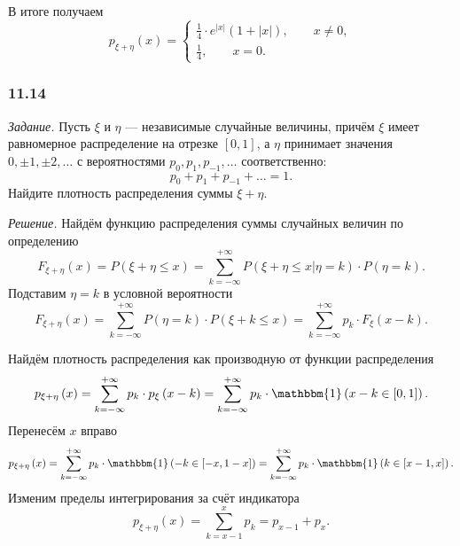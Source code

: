В итоге получаем
$$p_{ \xi + \eta } \left( x \right) =
\begin{cases}
\frac{1}{4} \cdot e^{ \left| x \right| } \left( 1 + \left| x \right| \right), \qquad x \neq 0, \\
\frac{1}{4}, \qquad x = 0.
\end{cases}$$

\subsubsection*{11.14}

\textit{Задание.}
Пусть $ \xi $ и $ \eta $ --- независимые случайные величины,
причём $ \xi $ имеет равномерное распределение на отрезке $ \left[ 0, 1 \right] $,
а $ \eta $ принимает значения $0, \pm 1, \pm 2, \dotsc $ с вероятностями $p_0, p_1, p_{-1}, \dotsc $ соответственно:
$$p_0 + p_1 + p_{-1} + \dotsc =
1.$$
Найдите плотность распределения суммы $ \xi + \eta $.

\textit{Решение.} Найдём функцию распределения суммы случайных величин по определению
$$F_{ \xi + \eta } \left( x \right) =
P \left( \xi + \eta \leq x \right) =
\sum \limits_{k = - \infty }^{+ \infty } P \left( \left. \xi + \eta \leq x \right| \eta = k \right) \cdot P \left( \eta = k \right).$$
Подставим $ \eta = k$ в условной вероятности
$$F_{ \xi + \eta } \left( x \right) =
\sum \limits_{k = - \infty }^{+ \infty } P \left( \eta = k \right) \cdot P \left( \xi + k \leq x \right) =
\sum \limits_{k = - \infty }^{+ \infty } p_k \cdot F_{ \xi } \left( x-k \right).$$

Найдём плотность распределения как производную от функции распределения
$$p_{ \xi + \eta } \left( x \right) =
\sum \limits_{k = - \infty }^{+ \infty } p_k \cdot p_{ \xi } \left( x-k \right) =
\sum \limits_{k = - \infty }^{+ \infty } p_k \cdot \mathbbm{1} \left( x-k \in \left[ 0, 1 \right] \right).$$
Перенесём $x$ вправо
$$p_{ \xi + \eta } \left( x \right) =
\sum \limits_{k = - \infty }^{+ \infty } p_k \cdot \mathbbm{1} \left( -k \in \left[ -x, 1-x \right] \right) =
\sum \limits_{k = - \infty }^{+ \infty } p_k \cdot \mathbbm{1} \left( k \in \left[ x-1, x \right] \right).$$
Изменим пределы интегрирования за счёт индикатора
$$p_{ \xi + \eta } \left( x \right) =
\sum \limits_{k =x-1}^{x} p_k =
p_{x-1} + p_x.$$
